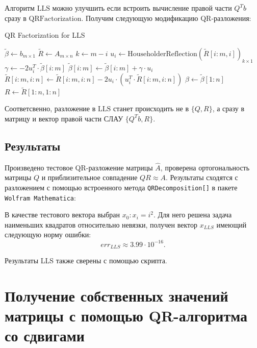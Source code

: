 \documentclass[a4paper,14pt]{extarticle}
\begin{document}
Алгоритм $\mathrm{LLS}$ можно улучшить если встроить вычисление правой части $Q^T b$ сразу в $\mathrm{QRFactorization}$. Получим следующую модификацию QR-разложения:

\begin{algorithm}[H]
\caption{QR Factorization for LLS}
\vspace{4pt}
$\tilde{\beta} \gets b_{m \times 1}$\;
$\tilde{R} \gets A_{m \times n}$\;
 {
	$k \gets m - i$\;
	$u_i \gets \mathrm{HouseholderReflection}(\tilde{R}[i:m, i])_{k \times 1}$\;
	$\gamma \gets -2 u_i^T \cdot \tilde{\beta}[i:m]$\;
	$\tilde{\beta}[i:m] \gets \tilde{\beta}[i:m] + \gamma \cdot u_i$
	$\tilde{R}[i:m, i:n] \gets \tilde{R}[i:m, i:n] - 2 u_i \cdot (u_i^T \cdot \tilde{R}[i:m, i:n])$\; 
}
$\beta \gets \tilde{\beta}[1:n]$\;
$R \gets \tilde{R}[1:n, 1:n]$\;
\end{algorithm}
\vspace{8pt}

\noindent Соответсвенно, разложение в $\mathrm{LLS}$ станет происходить не в $\lbrace Q, R \rbrace$, а сразу в матрицу и вектор правой части СЛАУ $\lbrace Q^T b, R \rbrace$.

\subsection{Результаты}

Произведено тестовое QR-разложение матрицы $\hat{A}$, проверена ортогональность матрицы $Q$ и приблизительное совпадение $QR \approx A$. Результаты сходятся с разложением с помощью встроенного метода \texttt{QRDecomposition[]} в пакете \texttt{Wolfram Mathematica}:

В качестве тестового вектора выбран $x_0: x_i = i^2$. Для него решена задача наименьших квадратов относительно невязки, получен вектор $x_{LLS}$ имеющий следующую норму ошибки:
\[
err_{LLS} \approx 3.99 \cdot 10^{-16}.
\]

Результаты LLS также сверены с помощью скрипта.

\section{Получение собственных значений матрицы с помощью QR-алгоритма со сдвигами}
\end{document}
